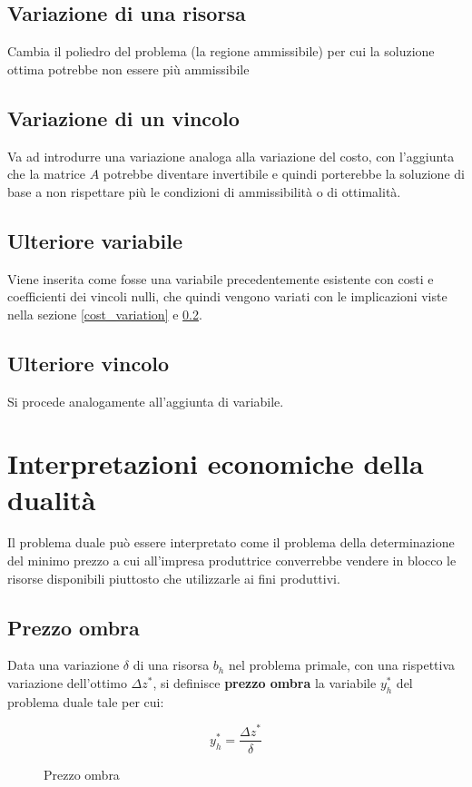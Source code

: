 \documentclass[\main/main.tex]{subfiles}
\begin{document}
\subsection{Variazione di una risorsa}
Cambia il poliedro del problema (la regione ammissibile) per cui la soluzione ottima potrebbe non essere più ammissibile

\subsection{Variazione di un vincolo} \label{constrain_variation}
Va ad introdurre una variazione analoga alla variazione del costo, con l'aggiunta che la matrice $A$ potrebbe diventare invertibile e quindi porterebbe la soluzione di base a non rispettare più le condizioni di ammissibilità o di ottimalità.

\subsection{Ulteriore variabile}
Viene inserita come fosse una variabile precedentemente esistente con costi e coefficienti dei vincoli nulli, che quindi vengono variati con le implicazioni viste nella sezione \ref{cost_variation} e \ref{constrain_variation}.

\subsection{Ulteriore vincolo}
Si procede analogamente all'aggiunta di variabile.

\section{Interpretazioni economiche della dualità}
Il problema duale può essere interpretato come il problema della determinazione del minimo prezzo a cui all'impresa produttrice converrebbe vendere in blocco le risorse disponibili piuttosto che utilizzarle ai fini produttivi.

\subsection{Prezzo ombra}
\begin{definition}
  Data una variazione $\delta$ di una risorsa $b_h$ nel problema primale, con una rispettiva variazione dell'ottimo $\Delta z^*$, si definisce \textbf{prezzo ombra} la variabile $y^*_h$ del problema duale tale per cui:

  \begin{figure}
    \[
      y^*_h = \frac{\Delta z^*}{\delta}
    \]
    \caption{Prezzo ombra}
  \end{figure}
\end{definition}
\end{document}
